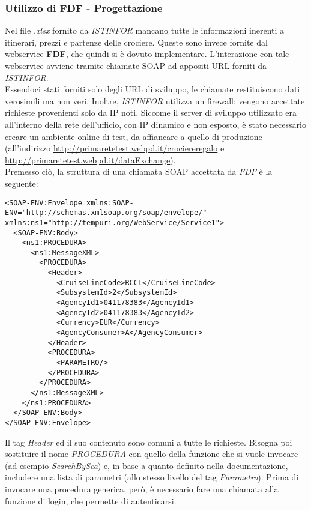 \subsubsection{Utilizzo di FDF - Progettazione}
Nel file \textit{.xlsx} fornito da \textit{ISTINFOR} mancano tutte le informazioni inerenti a itinerari, prezzi e partenze delle crociere. Queste sono invece fornite dal \gls{webservice} \textbf{FDF}, che quindi si è dovuto implementare. L'interazione con tale \gls{webservice} avviene tramite chiamate \gls{SOAP} ad appositi URL forniti da \textit{ISTINFOR}.\\ Essendoci stati forniti solo degli URL di sviluppo, le chiamate restituiscono dati verosimili ma non veri. Inoltre, \textit{ISTINFOR} utilizza un firewall: vengono accettate richieste provenienti solo da IP noti. Siccome il server di sviluppo utilizzato era all'interno della rete dell'ufficio, con IP dinamico e non esposto, è stato necessario creare un ambiente online di test, da affiancare a quello di produzione (all'indirizzo \url{http://primaretetest.webpd.it/crociereregalo} e \url{http://primaretetest.webpd.it/dataExchange}).\\
Premesso ciò, la struttura di una chiamata \gls{SOAP} accettata da \textit{FDF} è la seguente:
\begin{lstlisting}
<SOAP-ENV:Envelope xmlns:SOAP-ENV="http://schemas.xmlsoap.org/soap/envelope/" xmlns:ns1="http://tempuri.org/WebService/Service1">
  <SOAP-ENV:Body>
    <ns1:PROCEDURA>
      <ns1:MessageXML>
        <PROCEDURA>
          <Header>
            <CruiseLineCode>RCCL</CruiseLineCode>
            <SubsystemId>2</SubsystemId>
            <AgencyId1>041178383</AgencyId1>
            <AgencyId2>041178383</AgencyId2>
            <Currency>EUR</Currency>
            <AgencyConsumer>A</AgencyConsumer>
          </Header>
          <PROCEDURA>
            <PARAMETRO/>
          </PROCEDURA>
        </PROCEDURA>
      </ns1:MessageXML>
    </ns1:PROCEDURA>
  </SOAP-ENV:Body>
</SOAP-ENV:Envelope>
\end{lstlisting}Il tag \textit{Header} ed il suo contenuto sono comuni a tutte le richieste. Bisogna poi sostituire il nome \textit{PROCEDURA} con quello della funzione che si vuole invocare (ad esempio \textit{SearchBySea}) e, in base a quanto definito nella documentazione, includere una lista di parametri (allo stesso livello del tag \textit{Parametro}). Prima di invocare una procedura generica, però, è necessario fare una chiamata alla funzione di login, che permette di autenticarsi.

